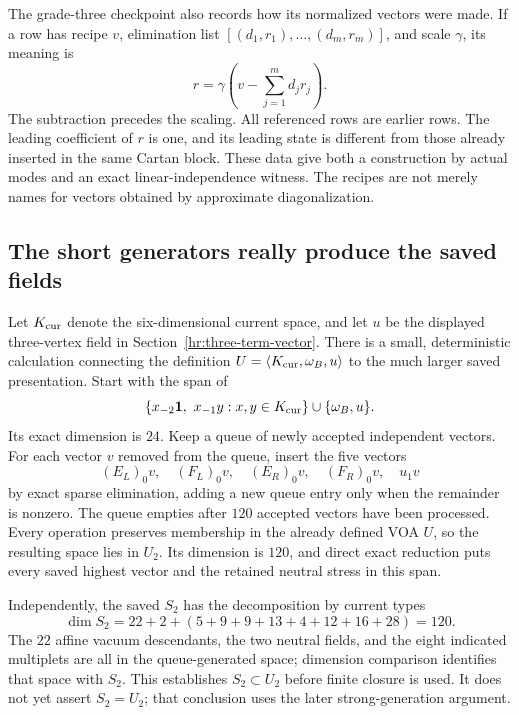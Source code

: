 The grade-three checkpoint also records how its normalized vectors
were made.  If a row has recipe $v$, elimination list
$[(d_1,r_1),\ldots,(d_m,r_m)]$, and scale $\gamma$, its meaning is
\begin{equation}\label{eq:reader-row-recipe}
       r=\gamma\left(v-\sum_{j=1}^m d_jr_j\right).
\end{equation}
The subtraction precedes the scaling.  All referenced rows are earlier
rows.  The leading coefficient of $r$ is one, and its leading state
is different from those already inserted in the same Cartan block.
These data give both a construction by actual modes and an exact
linear-independence witness.  The recipes are not merely names for
vectors obtained by approximate diagonalization.

\subsection{The short generators really produce the saved fields}

Let $K_{\rm cur}$ denote the six-dimensional current space, and let
$u$ be the displayed three-vertex field in
Section~\ref{hr:three-term-vector}.
There is a small, deterministic calculation connecting the definition
$U=\langle K_{\rm cur},\omega_B,u\rangle$ to the much larger saved
presentation.  Start with the span of
\[
 \{x_{-2}\mathbf1,\ x_{-1}y:x,y\in K_{\rm cur}\}
                   \cup\{\omega_B,u\}.
\]
Its exact dimension is $24$.  Keep a queue of newly accepted independent
vectors.  For each vector $v$ removed from the queue, insert the five
vectors
\[
       (E_L)_0v,\quad(F_L)_0v,\quad(E_R)_0v,\quad(F_R)_0v,
                          \quad u_1v
\]
by exact sparse elimination, adding a new queue entry only when the
remainder is nonzero.  The queue empties after $120$ accepted vectors
have been processed.  Every operation preserves membership in the
already defined VOA $U$, so the resulting space lies in $U_2$.
Its dimension is $120$, and direct exact reduction puts every saved
highest vector and the retained neutral stress in this span.

Independently, the saved $S_2$ has the decomposition by current types
\[
 \dim S_2=22+2+(5+9+9+13+4+12+16+28)=120.
\]
The $22$ affine vacuum descendants, the two neutral fields, and the
eight indicated multiplets are all in the queue-generated space;
dimension comparison identifies that space with $S_2$.
This establishes $S_2\subset U_2$ before finite closure is used.
It does not yet assert $S_2=U_2$; that conclusion uses the later
strong-generation argument.

